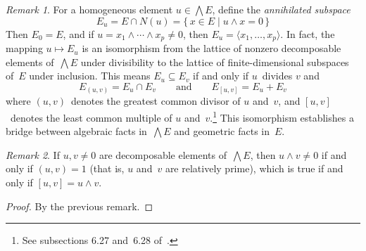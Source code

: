 \documentclass[letterpaper,12pt]{article}
\newcommand{\sect}{\cap}
\newcommand{\eprod}{\wedge}
\newcommand{\bigeprod}{\bigwedge}
\newcommand{\medeprod}{{\textstyle\bigeprod}}
\newcommand{\gen}[1]{\langle#1\rangle}
\newcommand{\multi}[4]{#2_{#3}#1\cdots#1#2_{#4}}
\newcommand{\eprods}[3]{\multi{\eprod}{#1}{#2}{#3}}
\theoremstyle{definition}
\theoremstyle{remark}
\newtheorem*{rmk}{Remark}
\begin{document}
\begin{rmk}
For a homogeneous element \(u\in\medeprod E\), define the \emph{annihilated subspace}
\[E_u=E\sect N(u)=\{\,x\in E\mid u\eprod x=0\,\}\]
Then \(E_0=E\), and if \(u=\eprods{x}{1}{p}\ne 0\), then \(E_u=\gen{x_1,\ldots,x_p}\). In fact, the mapping \(u\mapsto E_u\) is an isomorphism from the lattice of nonzero decomposable elements of~\(\medeprod E\) under divisibility to the lattice of finite-dimensional subspaces of~\(E\) under inclusion. This means \(E_u\subseteq E_v\) if and only if \(u\)~divides \(v\) and
\[E_{(u,v)}=E_u\sect E_v\qquad\text{and}\qquad E_{[u,v]}=E_u+E_v\]
where \((u,v)\)~denotes the greatest common divisor of \(u\) and~\(v\), and \([u,v]\)~denotes the least common multiple of \(u\) and~\(v\).\footnote{See subsections 6.27 and~6.28 of~\cite{greub3}.} This isomorphism establishes a bridge between algebraic facts in~\(\medeprod E\) and geometric facts in~\(E\).
\end{rmk}

\begin{rmk}
If \(u,v\ne 0\) are decomposable elements of~\(\medeprod E\), then \(u\eprod v\ne 0\) if and only if \((u,v)=1\) (that is, \(u\) and~\(v\) are relatively prime), which is true if and only if \([u,v]=u\eprod v\).
\end{rmk}
\begin{proof}
By the previous remark.
\end{proof}
\end{document}
